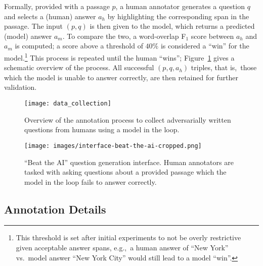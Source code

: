 \documentclass[11pt,a4paper]{article}
\begin{document}
Formally, provided with a passage $p$, a human annotator generates a question $q$ and selects a (human) answer $a_h$ by highlighting the corresponding span in the passage. 
The input $(p, q)$ is then given to the model, which returns a predicted (model) answer $a_m$. 
To compare the two, a word-overlap F$_\text{1}$ score between $a_h$ and $a_m$ is computed; 
a score above a threshold of $40\%$ is considered a ``win'' for the model.\footnote{
This threshold is set after initial experiments to not be overly restrictive given acceptable answer spans, e.g.,~a human answer of ``New York'' vs.~model answer ``New York City'' would still lead to a model ``win''.
}
This process is repeated until the human ``wins'';
Figure~\ref{fig:data_collection} gives a schematic overview of the process. 
All successful $(p, q, a_h)$ triples, that is,~those which the model is unable to answer correctly, are then retained for further validation.


\begin{figure}[t]
    \centering
    \texttt{[image: data\_collection]}
    \caption{Overview of the annotation process to collect adversarially written questions from humans using a model in the loop.
    } 
    \label{fig:data_collection}
\end{figure}


\begin{figure*}[!ht]
    \centering
    \texttt{[image: images/interface-beat-the-ai-cropped.png]}
    \caption{``Beat the AI'' question generation interface. Human annotators are tasked with asking questions about a provided passage which the model in the loop fails to answer correctly.} 
    \label{fig:interface_question_generation}
\end{figure*}


\subsection{Annotation Details}
\end{document}

